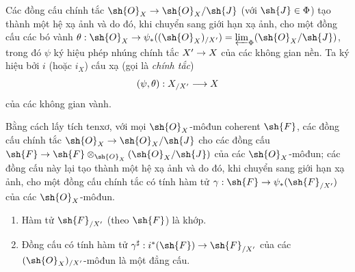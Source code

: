 \documentclass[oneside]{amsart}
\makeatletter
\newcommand{\ega@arrow}[2]{\mathchoice{#1}{#2}{#2}{#2}}
\renewcommand{\to}{\ega@arrow{\longrightarrow}{\rightarrow}}
\let\EGAOriginalLabel\label
\renewcommand{\label}[1]{\phantomsection\EGAOriginalLabel{#1}}
\makeatother
\begin{document}
\begin{env}[10.8.7]
\label{I.10.8.7}
Các đồng cấu chính tắc $\sh{O}_X\to\sh{O}_X/\sh{J}$ (với $\sh{J}\in\Phi$) tạo thành một hệ xạ ảnh và do đó, khi chuyển sang giới hạn xạ ảnh, cho một đồng cấu các bó vành $\theta:\sh{O}_X\to\psi_*((\sh{O}_X)_{/X'})=\varprojlim_\Phi(\sh{O}_X/\sh{J})$, trong đó $\psi$ ký hiệu phép nhúng chính tắc $X'\to X$ của các không gian nền.
Ta ký hiệu bởi $i$ (hoặc $i_X$) cấu xạ (gọi là \emph{chính tắc})
\[
  (\psi,\theta):X_{/X'}\to X
\]
của các không gian vành.

Bằng cách lấy tích tenxơ, với mọi $\sh{O}_X$-môđun coherent $\sh{F}$, các đồng cấu chính tắc $\sh{O}_X\to\sh{O}_X/\sh{J}$ cho các đồng cấu $\sh{F}\to\sh{F}\otimes_{\sh{O}_X}(\sh{O}_X/\sh{J})$ của các $\sh{O}_X$-môđun; các đồng cấu này lại tạo thành một hệ xạ ảnh và do đó, khi chuyển sang giới hạn xạ ảnh, cho một đồng cấu chính tắc có tính hàm tử $\gamma:\sh{F}\to\psi_*(\sh{F}_{/X'})$ của các $\sh{O}_X$-môđun.
\end{env}

\begin{proposition}[10.8.8]
\label{I.10.8.8}
\medskip\noindent
\begin{enumerate}
  \item[\rm{(i)}] Hàm tử $\sh{F}_{/X'}$ (theo $\sh{F}$) là khớp.
  \item[\rm{(ii)}] Đồng cấu có tính hàm tử $\gamma^\sharp:i^*(\sh{F})\to\sh{F}_{/X'}$ của các $(\sh{O}_X)_{/X'}$-môđun là một đẳng cấu.
\end{enumerate}
\end{proposition}
\end{document}
